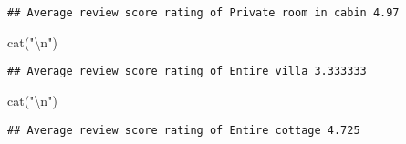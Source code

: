 \documentclass[
]{article}
\newenvironment{Shaded}{\begin{snugshade}}{\end{snugshade}}
\newcommand{\FunctionTok}[1]{\textcolor[rgb]{0.00,0.00,0.00}{#1}}
\newcommand{\NormalTok}[1]{#1}
\newcommand{\OtherTok}[1]{\textcolor[rgb]{0.56,0.35,0.01}{#1}}
\newcommand{\SpecialCharTok}[1]{\textcolor[rgb]{0.00,0.00,0.00}{#1}}
\newcommand{\StringTok}[1]{\textcolor[rgb]{0.31,0.60,0.02}{#1}}
\begin{document}
\begin{verbatim}
## Average review score rating of Private room in cabin 4.97
\end{verbatim}

\begin{Shaded}
\begin{Highlighting}[]
\FunctionTok{cat}\NormalTok{(}\StringTok{"}\SpecialCharTok{\textbackslash{}n}\StringTok{"}\NormalTok{)}
\end{Highlighting}
\end{Shaded}

\begin{Shaded}
\end{Shaded}

\begin{verbatim}
## Average review score rating of Entire villa 3.333333
\end{verbatim}

\begin{Shaded}
\begin{Highlighting}[]
\FunctionTok{cat}\NormalTok{(}\StringTok{"}\SpecialCharTok{\textbackslash{}n}\StringTok{"}\NormalTok{)}
\end{Highlighting}
\end{Shaded}

\begin{Shaded}
\end{Shaded}

\begin{verbatim}
## Average review score rating of Entire cottage 4.725
\end{verbatim}
\end{document}
